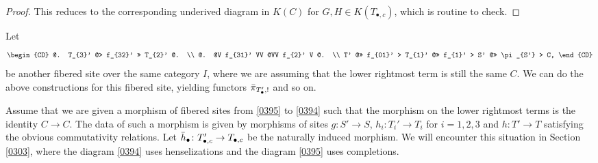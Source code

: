 \documentclass{amsart}
\theoremstyle{remark}
\numberwithin{equation}{subsection}
\begin{document}
\begin{proof}
	This reduces to the corresponding underived diagram in $K(C)$ for $G, H \in K(T_{\bullet, c})$,
	which is routine to check.
\end{proof}

Let
	\begin{equation} \label{0395}
		\begin{CD}
			@.
				T_{3}'
			@> f_{32}' >>
				T_{2}'
			@.
			\\ @. @V f_{31}' VV @VV f_{2}' V @. \\
				T'
			@>> f_{01}' >
				T_{1}'
			@>> f_{1}' >
				S'
			@>> \pi_{S'} >
				C,
		\end{CD}
	\end{equation}
be another fibered site over the same category $I$,
where we are assuming that the lower rightmost term is still the same $C$.
We can do the above constructions for this fibered site,
yielding functors $\Bar{\pi}_{T_{\bullet}', !}$ and so on.

Assume that we are given a morphism of fibered sites
from \eqref{0395} to \eqref{0394}
such that the morphism on the lower rightmost terms is the identity $C \to C$.
The data of such a morphism is given by morphisms of sites
$g \colon S' \to S$, $h_{i} \colon T_{i}' \to T_{i}$ for $i = 1, 2, 3$
and $h \colon T' \to T$ satisfying the obvious commutativity relations.
Let $\Bar{h}_{\bullet} \colon T_{\bullet, c}' \to T_{\bullet, c}$ be the naturally induced morphism.
We will encounter this situation in Section \ref{0303},
where the diagram \eqref{0394} uses henselizations
and the diagram \eqref{0395} uses completions.
\end{document}
